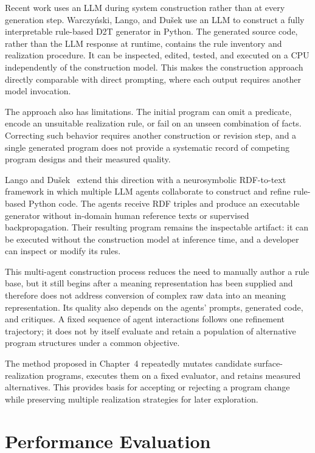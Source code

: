 Recent work uses an LLM during system construction rather than at every
generation step. Warczyński, Lango, and Dušek
\cite{warczynski-etal-2024-leveraging-large} use an LLM to construct a fully
interpretable rule-based D2T generator in Python. The generated source code,
rather than the LLM response at runtime, contains the rule inventory and
realization procedure. It can be inspected, edited, tested, and executed on a
CPU independently of the construction model. This makes the construction
approach directly comparable with direct prompting, where each output requires
another model invocation.

The approach also has limitations. The initial program can omit a predicate,
encode an unsuitable realization rule, or fail on an unseen combination of
facts. Correcting such behavior requires another construction or revision step,
and a single generated program does not provide a systematic record of competing
program designs and their measured quality.

Lango and Dušek~\cite{lango-dusek-2025-llm} extend this direction with a
neurosymbolic RDF-to-text framework in which multiple LLM agents collaborate to
construct and refine rule-based Python code. The agents receive RDF triples and
produce an executable generator without in-domain human reference texts or
supervised backpropagation. Their resulting program remains the inspectable
artifact: it can be executed without the construction model at inference time,
and a developer can inspect or modify its rules.

This multi-agent construction process reduces the need to manually author a
rule base, but it still begins after a meaning representation has been supplied and therefore does
not address conversion of complex raw data into an meaning representation. Its quality also depends
on the agents' prompts, generated code, and critiques. A fixed sequence of agent
interactions follows one refinement trajectory; it does not by itself evaluate
and retain a population of alternative program structures under a common
objective.

The method proposed in Chapter~4 repeatedly mutates candidate surface-realization programs,
executes them on a fixed evaluator, and retains measured alternatives. This
provides basis for accepting or rejecting a program change while preserving
multiple realization strategies for later exploration.

\section{Performance Evaluation}
\label{sec:d2t-performance-evaluation}

